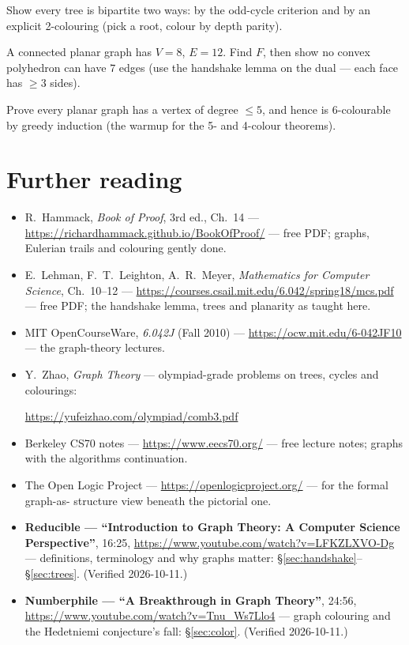\begin{exercise}[medium]
Show every tree is bipartite two ways: by the odd-cycle criterion and
by an explicit 2-colouring (pick a root, colour by depth parity).
\end{exercise}
\begin{exercise}[medium]
A connected planar graph has $V = 8$, $E = 12$. Find $F$, then show no
convex polyhedron can have $7$ edges (use the handshake lemma on the
dual --- each face has $\ge 3$ sides).
\end{exercise}
\begin{exercise}[hard]
Prove every planar graph has a vertex of degree $\le 5$, and hence is
6-colourable by greedy induction (the warmup for the 5- and 4-colour
theorems).
\end{exercise}

\section*{Further reading}
\begin{itemize}
\item R.~Hammack, \emph{Book of Proof}, 3rd ed., Ch.~14 ---
\url{https://richardhammack.github.io/BookOfProof/}
--- free PDF;
graphs, Eulerian trails and colouring gently done.
\item E.~Lehman, F.~T.~Leighton, A.~R.~Meyer, \emph{Mathematics for
Computer Science}, Ch.~10--12 ---
\url{https://courses.csail.mit.edu/6.042/spring18/mcs.pdf}
--- free PDF;
the handshake lemma, trees and planarity as taught here.
\item MIT OpenCourseWare, \emph{6.042J} (Fall 2010) ---
\url{https://ocw.mit.edu/6-042JF10}
--- the graph-theory lectures.
\item Y.~Zhao, \emph{Graph Theory} --- olympiad-grade
problems on trees, cycles and colourings:

\url{https://yufeizhao.com/olympiad/comb3.pdf}
\item Berkeley CS70 notes ---
\url{https://www.eecs70.org/}
--- free lecture notes; graphs with the
algorithms continuation.
\item The Open Logic Project ---
\url{https://openlogicproject.org/}
--- for the formal graph-as-
structure view beneath the pictorial one.
\end{itemize}

\begin{rulebox}
\begin{itemize}
\item \textbf{Reducible --- ``Introduction to Graph Theory: A Computer
Science Perspective''}, 16:25,
\url{https://www.youtube.com/watch?v=LFKZLXVO-Dg}
--- definitions,
terminology and why graphs matter: \S\ref{sec:handshake}--%
\S\ref{sec:trees}. (Verified 2026-10-11.)
\item \textbf{Numberphile --- ``A Breakthrough in Graph Theory''}, 24:56,
\url{https://www.youtube.com/watch?v=Tnu_Ws7Llo4}
--- graph colouring
and the Hedetniemi conjecture's fall: \S\ref{sec:color}.
(Verified 2026-10-11.)
\end{itemize}
\end{rulebox}

